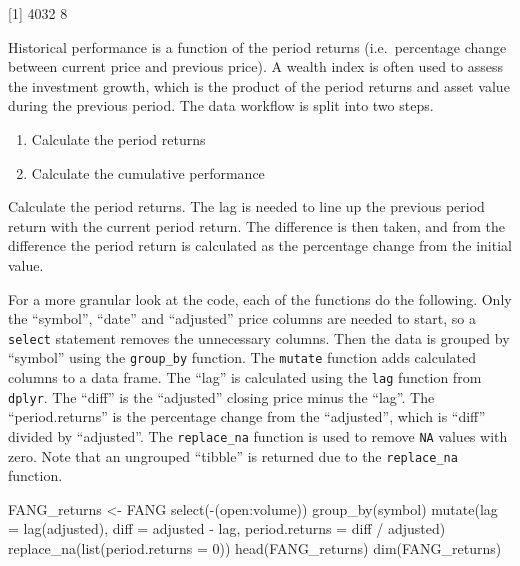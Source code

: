 {[}1{]} 4032 8

\hspace{20 mm}

Historical performance is a function of the period returns
(i.e.~percentage change between current price and previous price). A
wealth index is often used to assess the investment growth, which is the
product of the period returns and asset value during the previous
period. The data workflow is split into two steps.

\begin{enumerate}
\def\labelenumi{\arabic{enumi}.}
\tightlist
\item
  Calculate the period returns
\item
  Calculate the cumulative performance
\end{enumerate}

Calculate the period returns. The lag is needed to line up the previous
period return with the current period return. The difference is then
taken, and from the difference the period return is calculated as the
percentage change from the initial value.

For a more granular look at the code, each of the functions do the
following. Only the ``symbol'', ``date'' and ``adjusted'' price columns
are needed to start, so a \texttt{select} statement removes the
unnecessary columns. Then the data is grouped by ``symbol'' using the
\texttt{group\_by} function. The \texttt{mutate} function adds
calculated columns to a data frame. The ``lag'' is calculated using the
\texttt{lag} function from \texttt{dplyr}. The ``diff'' is the
``adjusted'' closing price minus the ``lag''. The ``period.returns'' is
the percentage change from the ``adjusted'', which is ``diff'' divided
by ``adjusted''. The \texttt{replace\_na} function is used to remove
\texttt{NA} values with zero. Note that an ungrouped ``tibble'' is
returned due to the \texttt{replace\_na} function.

\begin{Schunk}
\begin{Sinput}
FANG_returns <- FANG %
    select(-(open:volume)) %
    group_by(symbol) %
    mutate(lag = lag(adjusted),
           diff = adjusted - lag,
           period.returns = diff / adjusted) %
    replace_na(list(period.returns = 0)) 
head(FANG_returns)
dim(FANG_returns)
\end{Sinput}
\end{Schunk}

